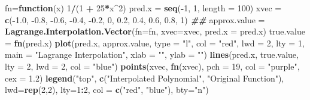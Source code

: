 \documentclass[
]{book}
\newenvironment{Shaded}{\begin{snugshade}}{\end{snugshade}}
\newcommand{\AttributeTok}[1]{\textcolor[rgb]{0.13,0.29,0.53}{#1}}
\newcommand{\ControlFlowTok}[1]{\textcolor[rgb]{0.13,0.29,0.53}{\textbf{#1}}}
\newcommand{\DecValTok}[1]{\textcolor[rgb]{0.00,0.00,0.81}{#1}}
\newcommand{\DocumentationTok}[1]{\textcolor[rgb]{0.56,0.35,0.01}{\textbf{\textit{#1}}}}
\newcommand{\FloatTok}[1]{\textcolor[rgb]{0.00,0.00,0.81}{#1}}
\newcommand{\FunctionTok}[1]{\textcolor[rgb]{0.13,0.29,0.53}{\textbf{#1}}}
\newcommand{\NormalTok}[1]{#1}
\newcommand{\OtherTok}[1]{\textcolor[rgb]{0.56,0.35,0.01}{#1}}
\newcommand{\SpecialCharTok}[1]{\textcolor[rgb]{0.81,0.36,0.00}{\textbf{#1}}}
\newcommand{\StringTok}[1]{\textcolor[rgb]{0.31,0.60,0.02}{#1}}
\begin{document}
\begin{Shaded}
\begin{Highlighting}[]
\NormalTok{fn}\OtherTok{=}\ControlFlowTok{function}\NormalTok{(x) }\DecValTok{1}\SpecialCharTok{/}\NormalTok{(}\DecValTok{1} \SpecialCharTok{+} \DecValTok{25}\SpecialCharTok{*}\NormalTok{x}\SpecialCharTok{\^{}}\DecValTok{2}\NormalTok{)}
\NormalTok{pred.x }\OtherTok{=} \FunctionTok{seq}\NormalTok{(}\SpecialCharTok{{-}}\DecValTok{1}\NormalTok{, }\DecValTok{1}\NormalTok{, }\AttributeTok{length =} \DecValTok{100}\NormalTok{)}
\NormalTok{xvec }\OtherTok{=} \FunctionTok{c}\NormalTok{(}\SpecialCharTok{{-}}\FloatTok{1.0}\NormalTok{, }\SpecialCharTok{{-}}\FloatTok{0.8}\NormalTok{, }\SpecialCharTok{{-}}\FloatTok{0.6}\NormalTok{, }\SpecialCharTok{{-}}\FloatTok{0.4}\NormalTok{, }\SpecialCharTok{{-}}\FloatTok{0.2}\NormalTok{, }\DecValTok{0}\NormalTok{, }\FloatTok{0.2}\NormalTok{, }\FloatTok{0.4}\NormalTok{, }\FloatTok{0.6}\NormalTok{, }\FloatTok{0.8}\NormalTok{, }\DecValTok{1}\NormalTok{)}
\DocumentationTok{\#\#}
\NormalTok{approx.value }\OtherTok{=} \FunctionTok{Lagrange.Interpolation.Vector}\NormalTok{(}\AttributeTok{fn=}\NormalTok{fn, }\AttributeTok{xvec=}\NormalTok{xvec, }
                                             \AttributeTok{pred.x =}\NormalTok{ pred.x)}
\NormalTok{true.value }\OtherTok{=} \FunctionTok{fn}\NormalTok{(pred.x)}
\FunctionTok{plot}\NormalTok{(pred.x, approx.value, }\AttributeTok{type =} \StringTok{"l"}\NormalTok{, }\AttributeTok{col =} \StringTok{"red"}\NormalTok{, }\AttributeTok{lwd =} \DecValTok{2}\NormalTok{, }\AttributeTok{lty =} \DecValTok{1}\NormalTok{,}
            \AttributeTok{main =} \StringTok{"Lagrange Interpolation"}\NormalTok{,}
             \AttributeTok{xlab =} \StringTok{""}\NormalTok{,}
             \AttributeTok{ylab =} \StringTok{""}\NormalTok{)}
\FunctionTok{lines}\NormalTok{(pred.x, true.value, }\AttributeTok{lty =} \DecValTok{2}\NormalTok{, }\AttributeTok{lwd =} \DecValTok{2}\NormalTok{, }\AttributeTok{col =} \StringTok{"blue"}\NormalTok{)}
\FunctionTok{points}\NormalTok{(xvec, }\FunctionTok{fn}\NormalTok{(xvec), }\AttributeTok{pch =} \DecValTok{19}\NormalTok{, }\AttributeTok{col =} \StringTok{"purple"}\NormalTok{, }\AttributeTok{cex =} \FloatTok{1.2}\NormalTok{)}
\FunctionTok{legend}\NormalTok{(}\StringTok{"top"}\NormalTok{, }\FunctionTok{c}\NormalTok{(}\StringTok{"Interpolated Polynomial"}\NormalTok{, }\StringTok{"Original Function"}\NormalTok{), }
       \AttributeTok{lwd=}\FunctionTok{rep}\NormalTok{(}\DecValTok{2}\NormalTok{,}\DecValTok{2}\NormalTok{), }\AttributeTok{lty=}\DecValTok{1}\SpecialCharTok{:}\DecValTok{2}\NormalTok{, }\AttributeTok{col =} \FunctionTok{c}\NormalTok{(}\StringTok{"red"}\NormalTok{, }\StringTok{"blue"}\NormalTok{), }\AttributeTok{bty=}\StringTok{"n"}\NormalTok{)}
\end{Highlighting}
\end{Shaded}
\end{document}

